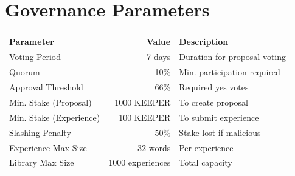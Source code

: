 \section{Governance Parameters}


\begin{center}
\begin{tabular}{lrl}
\toprule
\textbf{Parameter} & \textbf{Value} & \textbf{Description} \\
\midrule
Voting Period & 7 days & Duration for proposal voting \\
Quorum & 10\% & Min. participation required \\
Approval Threshold & 66\% & Required yes votes \\
Min. Stake (Proposal) & 1000 KEEPER & To create proposal \\
Min. Stake (Experience) & 100 KEEPER & To submit experience \\
Slashing Penalty & 50\% & Stake lost if malicious \\
Experience Max Size & 32 words & Per experience \\
Library Max Size & 1000 experiences & Total capacity \\
\bottomrule
\end{tabular}
\end{center}

